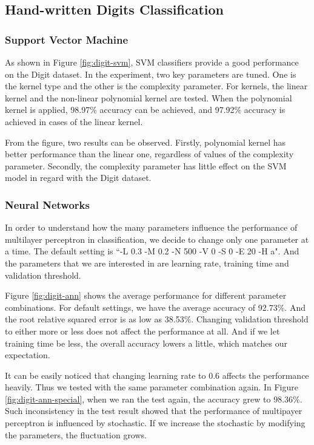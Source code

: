 \documentclass[11pt]{article}
\begin{document}
\subsection{Hand-written Digits Classification}
\subsubsection{Support Vector Machine}

As shown in Figure \ref{fig:digit-svm}, SVM classifiers provide a good performance on the Digit dataset. In the experiment, two key parameters are tuned. One is the kernel type and the other is the complexity parameter. For kernels, the linear kernel and the non-linear polynomial kernel are tested. When the polynomial kernel is applied, 98.97\% accuracy can be achieved, and 97.92\% accuracy is achieved in cases of the linear kernel. 

From the figure, two results can be observed. Firstly, polynomial kernel has better performance than the linear one, regardless of values of the complexity parameter. Secondly, the complexity parameter has little effect on the SVM model in regard with the Digit dataset. 

\subsubsection{Neural Networks}
In order to understand how the many parameters influence the performance of multilayer perceptron in classification, we decide to change only one parameter at a time. The default setting is ``-L 0.3 -M 0.2 -N 500 -V 0 -S 0 -E 20 -H a". And the parameters that we are interested in are learning rate, training time and validation threshold.

Figure \ref{fig:digit-ann} shows the average performance for different parameter combinations. For default settings, we have the average accuracy of 92.73\%. And the root relative squared error is as low as 38.53\%. Changing validation threshold to either more or less does not affect the performance at all. And if we let training time be less, the overall accuracy lowers a little, which matches our expectation.

It can be easily noticed that changing learning rate to 0.6 affects the performance heavily. Thus we tested with the same parameter combination again. In Figure \ref{fig:digit-ann-special}, when we ran the test again, the accuracy grew to 98.36\%. Such inconsistency in the test result showed that the performance of multipayer perceptron is influenced by stochastic. If we increase the stochastic by modifying the parameters, the fluctuation grows.
\end{document}
